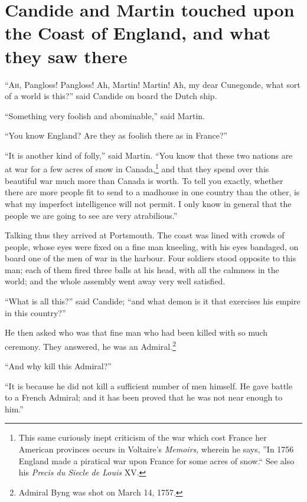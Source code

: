 \vspace{1cm}
\begingroup
\let\clearpage\relax
\chapter{Candide and Martin touched upon the Coast of England, and what they saw there}
\thispagestyle{pter}
\endgroup
\vspace{-1cm}
\lettrine[lraise=0.1,nindent=0em,slope=-.5em]{``A}{h}, Pangloss! Pangloss! Ah, Martin! Martin! Ah, my dear Cunegonde, what sort of a world is this?'' said Candide on board the Dutch ship.

``Something very foolish and abominable,'' said Martin.

``You know England? Are they as foolish there as in France?''

``It is another kind of folly,'' said Martin. ``You know that these two nations are at war for a few acres of snow in Canada,\footnote{This same curiously inept criticism of the war which cost France her American provinces occurs in Voltaire's \textit{Memoirs}, wherein he says, ''In 1756 England made a piratical war upon France for some acres of snow.`` See also his \textit{Precis du Siecle de Louis} XV.} and that they spend over this beautiful war much more than Canada is worth. To tell you exactly, whether there are more people fit to send to a madhouse in one country than the other, is what my imperfect intelligence will not permit. I only know in general that the people we are going to see are very atrabilious.''

Talking thus they arrived at Portsmouth. The coast was lined with crowds of people, whose eyes were fixed on a fine man kneeling, with his eyes bandaged, on board one of the men of war in the harbour. Four soldiers stood opposite to this man; each of them fired three balls at his head, with all the calmness in the world; and the whole assembly went away very well satisfied.

``What is all this?'' said Candide; ``and what demon is it that exercises his empire in this country?''

He then asked who was that fine man who had been killed with so much ceremony. They answered, he was an Admiral.\footnote{Admiral Byng was shot on March 14, 1757.}

``And why kill this Admiral?''

``It is because he did not kill a sufficient number of men himself. He gave battle to a French Admiral; and it has been proved that he was not near enough to him.''

